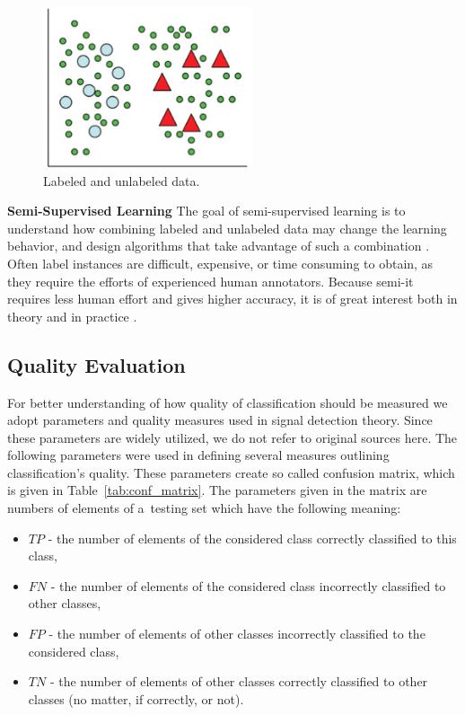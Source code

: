 \documentclass{mini}
\begin{document}
\begin{figure}
  \begin{center}
    \includegraphics[width=0.55\textwidth]{images/semi_supervised_graph.png}
  \end{center}
  \caption{Labeled and unlabeled data.}
  \label{fig:handwritten_ex}
\end{figure}

\textbf{Semi-Supervised Learning} The goal of semi-supervised learning is to understand how combining labeled and unlabeled data may change the learning behavior, and design algorithms that take advantage of such a combination \cite{semi_supervised}. Often label instances are difficult, expensive, or time consuming to obtain, as they require the efforts of experienced human annotators. Because semi-it requires less human effort and gives higher accuracy, it is of great interest both in theory and in practice \cite{semi_supervised2}.

\pagebreak
\subsection{Quality Evaluation}\label{evaluation}
For better understanding of how quality of classification should be measured we adopt parameters and quality measures used in signal detection theory. Since these parameters are widely utilized, we do not refer to original sources here. The following parameters were used in defining several measures outlining classification's quality. These parameters create so called confusion matrix, which is given in Table~\ref{tab:conf_matrix}. The parameters given in the matrix are numbers of elements of a~testing set which have the following meaning:
\begin{itemize}
  \item $TP$ - the number of elements of the considered class correctly classified to this class,
  \item $FN$ - the number of elements of the considered class incorrectly classified to other classes,  
  \item $FP$ - the number of elements of other classes incorrectly classified to the considered class,  
  \item $TN$ - the number of elements of other classes correctly classified to other classes (no matter, if correctly, or not).  
\end{itemize}  
\end{document}
